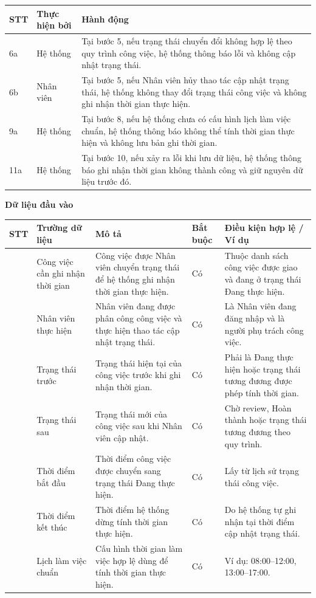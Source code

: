 \documentclass[../DoAn.tex]{subfiles}
\begin{document}
{\ucTableText
\begin{longtable}{|>{\centering\arraybackslash}p{}|p{}|p{}|}
\hline
\rowcolor{ucHeaderBg}\textbf{STT} & \textbf{Thực hiện bởi} & \textbf{Hành động} \\ \hline
6a & Hệ thống & Tại bước 5, nếu trạng thái chuyển đổi không hợp lệ theo quy trình công việc, hệ thống thông báo lỗi và không cập nhật trạng thái. \\ \hline
6b & Nhân viên & Tại bước 5, nếu Nhân viên hủy thao tác cập nhật trạng thái, hệ thống không thay đổi trạng thái công việc và không ghi nhận thời gian thực hiện. \\ \hline
9a & Hệ thống & Tại bước 8, nếu hệ thống chưa có cấu hình lịch làm việc chuẩn, hệ thống thông báo không thể tính thời gian thực hiện và không lưu bản ghi thời gian. \\ \hline
11a & Hệ thống & Tại bước 10, nếu xảy ra lỗi khi lưu dữ liệu, hệ thống thông báo ghi nhận thời gian không thành công và giữ nguyên dữ liệu trước đó. \\ \hline
\end{longtable}
}

\textbf{Dữ liệu đầu vào}

{\ucDataText
\begin{longtable}{|>{\centering\arraybackslash}p{}|>{\raggedright\arraybackslash}p{}|>{\raggedright\arraybackslash}p{}|>{\raggedright\arraybackslash}p{}|>{\raggedright\arraybackslash}p{}|}
\hline
\rowcolor{ucHeaderBg}\textbf{STT} & \textbf{Trường dữ liệu} & \textbf{Mô tả} & \textbf{Bắt buộc} & \textbf{Điều kiện hợp lệ / Ví dụ} \\ \hline
1 & Công việc cần ghi nhận thời gian & Công việc được Nhân viên chuyển trạng thái để hệ thống ghi nhận thời gian thực hiện. & Có & Thuộc danh sách công việc được giao và đang ở trạng thái Đang thực hiện. \\ \hline
2 & Nhân viên thực hiện & Nhân viên đang được phân công công việc và thực hiện thao tác cập nhật trạng thái. & Có & Là Nhân viên đang đăng nhập và là người phụ trách công việc. \\ \hline
3 & Trạng thái trước & Trạng thái hiện tại của công việc trước khi ghi nhận thời gian. & Có & Phải là Đang thực hiện hoặc trạng thái tương đương được phép tính thời gian. \\ \hline
4 & Trạng thái sau & Trạng thái mới của công việc sau khi Nhân viên cập nhật. & Có & Chờ review, Hoàn thành hoặc trạng thái tương đương theo quy trình. \\ \hline
5 & Thời điểm bắt đầu & Thời điểm công việc được chuyển sang trạng thái Đang thực hiện. & Có & Lấy từ lịch sử trạng thái công việc. \\ \hline
6 & Thời điểm kết thúc & Thời điểm hệ thống dừng tính thời gian thực hiện. & Có & Do hệ thống tự ghi nhận tại thời điểm cập nhật trạng thái. \\ \hline
7 & Lịch làm việc chuẩn & Cấu hình thời gian làm việc hợp lệ dùng để tính thời gian thực hiện. & Có & Ví dụ: 08:00--12:00, 13:00--17:00. \\ \hline
\end{longtable}
}
\end{document}
